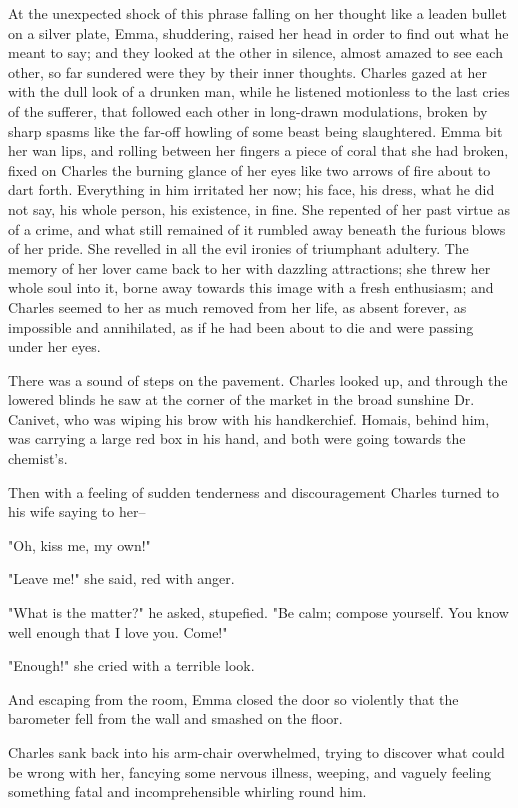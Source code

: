 \documentclass{tufte-book}
\begin{document}
At the unexpected shock of this phrase falling on her thought like a
leaden bullet on a silver plate, Emma, shuddering, raised her head in
order to find out what he meant to say; and they looked at the other in
silence, almost amazed to see each other, so far sundered were they
by their inner thoughts. Charles gazed at her with the dull look of
a drunken man, while he listened motionless to the last cries of the
sufferer, that followed each other in long-drawn modulations, broken by
sharp spasms like the far-off howling of some beast being slaughtered.
Emma bit her wan lips, and rolling between her fingers a piece of coral
that she had broken, fixed on Charles the burning glance of her eyes
like two arrows of fire about to dart forth. Everything in him irritated
her now; his face, his dress, what he did not say, his whole person, his
existence, in fine. She repented of her past virtue as of a crime, and
what still remained of it rumbled away beneath the furious blows of her
pride. She revelled in all the evil ironies of triumphant adultery.
The memory of her lover came back to her with dazzling attractions; she
threw her whole soul into it, borne away towards this image with a fresh
enthusiasm; and Charles seemed to her as much removed from her life, as
absent forever, as impossible and annihilated, as if he had been about
to die and were passing under her eyes.

There was a sound of steps on the pavement. Charles looked up, and
through the lowered blinds he saw at the corner of the market in
the broad sunshine Dr. Canivet, who was wiping his brow with his
handkerchief. Homais, behind him, was carrying a large red box in his
hand, and both were going towards the chemist's.

Then with a feeling of sudden tenderness and discouragement Charles
turned to his wife saying to her--

"Oh, kiss me, my own!"

"Leave me!" she said, red with anger.

"What is the matter?" he asked, stupefied. "Be calm; compose yourself.
You know well enough that I love you. Come!"

"Enough!" she cried with a terrible look.

And escaping from the room, Emma closed the door so violently that the
barometer fell from the wall and smashed on the floor.

Charles sank back into his arm-chair overwhelmed, trying to discover
what could be wrong with her, fancying some nervous illness, weeping,
and vaguely feeling something fatal and incomprehensible whirling round
him.
\end{document}
